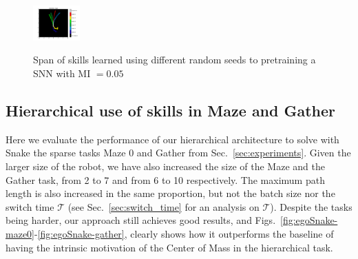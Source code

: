 \documentclass{article} %
\begin{document}
\begin{figure}[h!]
{		\centering
		\label{fig:visit-snn-snake-50}
		\includegraphics[trim={2cm 0.7cm 5cm 1.5cm}, clip, width = 0.16\textwidth]{Figures/egoSnake64-snn_005MI_5grid_6lat_categorical_bil_0050_visitation.png}
	}
	\caption{Span of skills learned using different random seeds to pretraining a SNN with MI $= 0.05$}
	\label{fig:visitation-snn-egoSnake}
\end{figure}

\subsection{Hierarchical use of skills in Maze and Gather}
\label{sec:snake-hierarchy}
Here we evaluate the performance of our hierarchical architecture to solve with Snake the sparse tasks Maze 0 and Gather from Sec.\ \ref{sec:experiments}. Given the larger size of the robot, we have also increased the size of the Maze and the Gather task, from 2 to 7 and from 6 to 10 respectively. The maximum path length is also increased in the same proportion, but not the batch size nor the switch time $\mathcal{T}$ (see Sec.\ \ref{sec:switch_time} for an analysis on $\mathcal{T}$). Despite the tasks being harder, our approach still achieves good results, and Figs.\ \ref{fig:egoSnake-maze0}-\ref{fig:egoSnake-gather}, clearly shows how it outperforms the baseline of having the intrinsic motivation of the Center of Mass in the hierarchical task.
\end{document}
